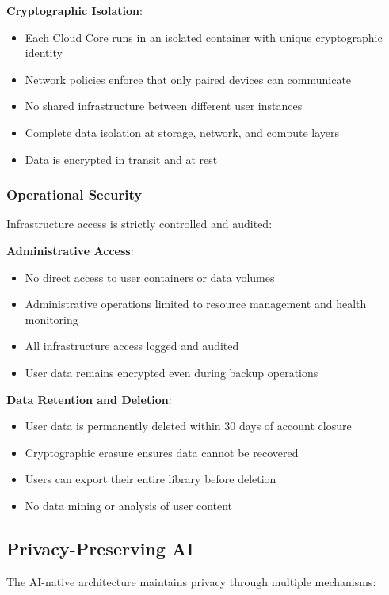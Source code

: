 \documentclass[sigconf]{acmart}
\begin{document}
\textbf{Cryptographic Isolation}:
\begin{itemize}[noitemsep, topsep=0pt]
 \item Each Cloud Core runs in an isolated container with unique cryptographic identity
 \item Network policies enforce that only paired devices can communicate
 \item No shared infrastructure between different user instances
 \item Complete data isolation at storage, network, and compute layers
 \item Data is encrypted in transit and at rest
\end{itemize}

\subsubsection{Operational Security}
Infrastructure access is strictly controlled and audited:

\textbf{Administrative Access}:
\begin{itemize}[noitemsep, topsep=0pt]
 \item No direct access to user containers or data volumes
 \item Administrative operations limited to resource management and health monitoring
 \item All infrastructure access logged and audited
 \item User data remains encrypted even during backup operations
\end{itemize}

\textbf{Data Retention and Deletion}:
\begin{itemize}[noitemsep, topsep=0pt]
 \item User data is permanently deleted within 30 days of account closure
 \item Cryptographic erasure ensures data cannot be recovered
 \item Users can export their entire library before deletion
 \item No data mining or analysis of user content
\end{itemize}

\subsection{Privacy-Preserving AI}
The AI-native architecture maintains privacy through multiple mechanisms:
\end{document}
